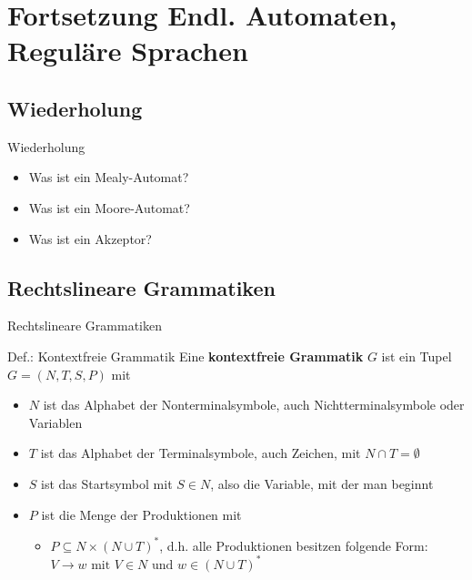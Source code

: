 \section[Reguläre Sprachen]{Fortsetzung Endl. Automaten, Reguläre Sprachen}
\subsection{Wiederholung}
\begin{frame}{Wiederholung}
  \begin{itemize}
    \item Was ist ein Mealy-Automat?
    \item Was ist ein Moore-Automat?
    \item Was ist ein Akzeptor?
  \end{itemize}
\end{frame}

\subsection{Rechtslineare Grammatiken}
\begin{frame}{Rechtslineare Grammatiken}
\begin{block}{Def.: Kontextfreie Grammatik}
	Eine \textbf{kontextfreie Grammatik} $G$ ist ein Tupel $G = (N,T,S,P)$ mit
	\begin{itemize}
		\item $N$ ist das Alphabet der Nonterminalsymbole, auch Nichtterminalsymbole oder Variablen
		\item $T$ ist das Alphabet der Terminalsymbole, auch Zeichen, mit $N \cap T = \emptyset$
		\item $S$ ist das Startsymbol mit $S \in N$, also die Variable, mit der man beginnt
		\item $P$ ist die Menge der Produktionen mit
			\begin{itemize}
				\item $P \subseteq N \times (N \cup T)^*$, d.h. alle Produktionen besitzen folgende Form:\\
				$V \to w \text{ mit } V \in N \text{ und } w \in (N \cup T)^*$
			\end{itemize}
	\end{itemize}
\end{block}
\end{frame}

